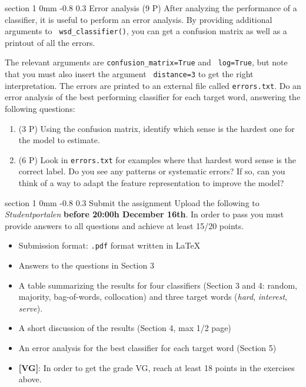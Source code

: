 \documentclass[11pt]{article}
\makeatletter
\newcommand{\newsec}[2]{\section{#1}\label{sec:#2}\noindent}
\renewcommand{\section}{\@startsection
{section}%
{1}%
{0mm}%
{-0.8\baselineskip}%
{0.3\baselineskip}%
{\bfseries\large}}%
\makeatother
\begin{document}
\newsec{Error analysis (9 P)}{submit}%
After analyzing the performance of a classifier, it is useful to
perform an error analysis. By providing additional arguments to {\tt
  wsd\_classifier()}, you can get a confusion matrix as well as a
printout of all the errors.
\begin{center}
\fbox{
\scalebox{0.55}{

}}
\end{center}
The relevant arguments are {\tt confusion\_matrix=True} and {\tt
  log=True}, but note that you must also insert the argument {\tt
  distance=3} to get the right interpretation. The errors are printed
to an external file called {\tt errors.txt}. Do an error analysis of
the best performing classifier for each target word, answering the
following questions:
\begin{enumerate}
\item (3 P) Using the confusion matrix, identify which sense is the hardest
  one for the model to estimate.
\item (6 P) Look in {\tt errors.txt} for examples where that hardest word
  sense is the correct label.  Do you see any patterns or systematic
  errors? If so, can you think of a way to adapt the feature
  representation to improve the model?
\end{enumerate}
\newsec{Submit the assignment}{submit}%
Upload the following to {\it Studentportalen} \textbf{before 20:00h
  December 16th}. In order to pass you must provide answers to all
questions and achieve at least 15/20 points.
\begin{itemize}[noitemsep,topsep=0.2cm]
\item Submission format: \texttt{.pdf} format written in \LaTeX
\item Answers to the questions in Section 3 
\item A table summarizing the results for four classifiers (Section 3
  and 4: random, majority, bag-of-words, collocation) and three target
  words (\emph{hard}, \emph{interest}, \emph{serve}).
\item A short discussion of the results (Section 4, max 1/2 page)
\item An error analysis for the best classifier for each target word (Section 5)
\item \textbf{[VG]}: In order to get the grade VG, reach at least 18
  points in the exercises above.
\end{itemize}
\end{document}
